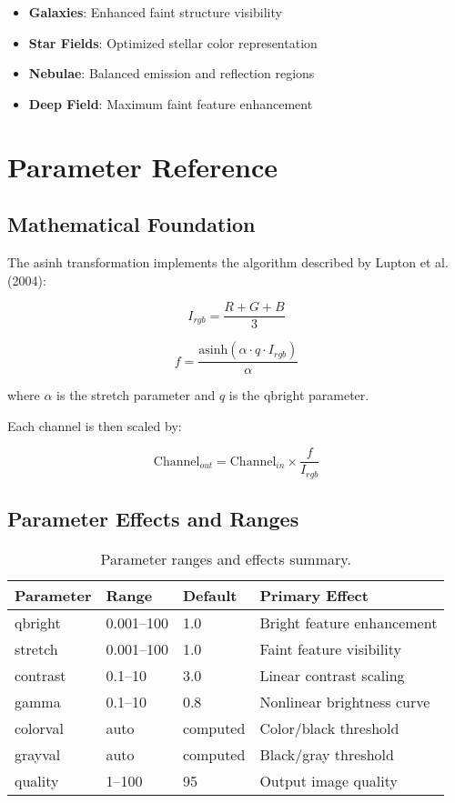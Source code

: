 \documentclass[11pt,a4paper]{article}
\begin{document}
\begin{itemize}[leftmargin=*]
\item \textbf{Galaxies}: Enhanced faint structure visibility
\item \textbf{Star Fields}: Optimized stellar color representation
\item \textbf{Nebulae}: Balanced emission and reflection regions
\item \textbf{Deep Field}: Maximum faint feature enhancement
\end{itemize}

\section{Parameter Reference}

\subsection{Mathematical Foundation}

The asinh transformation implements the algorithm described by Lupton et al.
(2004):

\begin{equation}
I_{rgb} = \frac{R + G + B}{3}
\end{equation}

\begin{equation}
f = \frac{\text{asinh}(\alpha \cdot q \cdot I_{rgb})}{\alpha}
\end{equation}

where $\alpha$ is the stretch parameter and $q$ is the qbright parameter.

Each channel is then scaled by:

\begin{equation}
\text{Channel}_{out} = \text{Channel}_{in} \times \frac{f}{I_{rgb}}
\end{equation}

\subsection{Parameter Effects and Ranges}

\begin{table}[H]
\centering
\begin{tabular}{@{}llll@{}}
\toprule
Parameter & Range & Default & Primary Effect \\
\midrule
qbright & 0.001--100 & 1.0 & Bright feature enhancement \\
stretch & 0.001--100 & 1.0 & Faint feature visibility \\
contrast & 0.1--10 & 3.0 & Linear contrast scaling \\
gamma & 0.1--10 & 0.8 & Nonlinear brightness curve \\
colorval & auto & computed & Color/black threshold \\
grayval & auto & computed & Black/gray threshold \\
quality & 1--100 & 95 & Output image quality \\
\bottomrule
\end{tabular}
\caption{Parameter ranges and effects summary.}
\label{tab:parameters}
\end{table}
\end{document}
